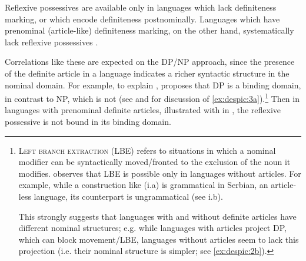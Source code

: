 \documentclass[output=paper,
modfonts
]{langscibook}
\begin{document}
	\ex \label{ex:despic:3b}
	Reflexive possessives are available only in languages which lack definiteness marking, or which encode definiteness postnominally. Languages which have prenominal (article-like) definiteness marking, on the other hand, systematically lack reflexive possessives \citep{Reuland2011, Despic2015}.
	\z
	\z 
	
	Correlations like these are expected on the DP/NP approach, since the presence of the definite article in a language indicates a richer syntactic structure in the nominal domain. 
	For example, to explain , \citet{Despic2015} proposes that DP is a binding domain, in contrast to NP, which is not (see \citealt{Boskovic2012} and \citealt{Despic2015} for discussion of \ref{ex:despic:3a}).\footnote{\textsc{Left branch extraction} (LBE) refers to situations in which a nominal modifier can be syntactically moved/fronted to the exclusion of the noun it modifies. \citet{Boskovic2008, Boskovic2012} observes that LBE is possible only in languages without articles. For example, while a construction like (i.a) is grammatical in Serbian, an article-less language, its  counterpart is ungrammatical (see i.b). 

		\ea \label{ex:despic:n3}
		
	    \z
	    \z 
	
	This strongly suggests that languages with and without definite articles have different nominal structures; e.g. while languages with articles project DP, which can block movement/LBE, languages without articles seem to lack this projection (i.e. their nominal structure is simpler; see \ref{ex:despic:2b}).
	}
	Then in languages with prenominal definite articles, illustrated with  in , the reflexive possessive is not bound in its binding domain.
	
\end{document}
